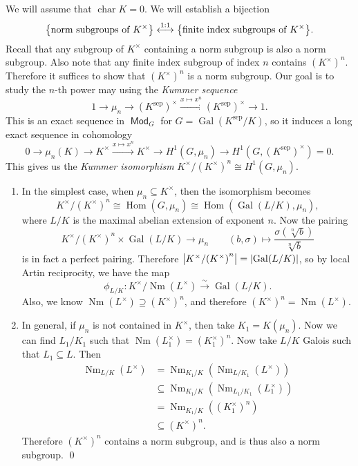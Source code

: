 \documentclass[leqno, openany]{memoir}
\theoremstyle{definition}
\theoremstyle{remark}
\theoremstyle{plain}
\theoremstyle{definition}
\theoremstyle{remark}
\newcommand{\mr}[1]{\mathrm{#1}}
\DeclareMathOperator{\Hom}{Hom}
\DeclareMathOperator{\Gal}{Gal}
\DeclareMathOperator{\Mod}{\mathsf{Mod}}
\DeclareMathOperator{\Nm}{Nm}
\begin{document}
We will assume that $\operatorname{char} K = 0$. We will establish a bijection
\[ \qty{\text{norm subgroups of $K^{\times}$}}
\overset{1:1}{\longleftrightarrow} \qty{\text{finite index subgroups of
$K^{\times}$}}. \] Recall that any subgroup of $K^{\times}$ containing a norm
subgroup is also a norm subgroup. Also note that any finite index subgroup of
index $n$ contains ${(K^{\times})}^n$. Therefore it suffices to show that
${(K^{\times})}^n$ is a norm subgroup. Our goal is to study the $n$-th power
may using the \textit{Kummer sequence} \[ 1 \to \mu_n \to
{(K^{\mr{sep}})}^{\times} \xrightarrow{x \mapsto x^n} {(K^{\mr{sep}})}^{\times}
\to 1. \] This is an exact sequence in $\Mod_G$ for $G = \Gal(K^{\mr{sep}}/K)$,
so it induces a long exact sequence in cohomology \[ 0 \to \mu_n(K) \to
K^{\times} \xrightarrow{x \mapsto x^n} K^{\times} \to H^1(G, \mu_n) \to H^1(G,
{(K^{\mr{sep}})}^{\times}) = 0. \] This gives us the \textit{Kummer
isomorphism} $K^{\times}/{(K^{\times})}^n \cong H^1(G, \mu_n)$.
\begin{enumerate} \item In the simplest case, when $\mu_n \subseteq
    K^{\times}$, then the isomorphism becomes \[ K^{\times}/{(K^{\times})}^n
    \cong \Hom(G, \mu_n) \cong \Hom(\Gal(L/K), \mu_n), \] where $L/K$ is the
    maximal abelian extension of exponent $n$. Now the pairing \[
    K^{\times}/{(K^{\times})}^n \times \Gal(L/K) \to \mu_n \qquad (b, \sigma)
\mapsto \frac{\sigma(\sqrt[n]{b})}{\sqrt[n]{b}} \] is in fact a perfect
pairing. Therefore $\abs{K^{\times}/{(K^{\times})}^n} = \abs{\Gal(L/K)}$, so by
local Artin reciprocity, we have the map \[ \phi_{L/K} \colon
K^{\times}/\Nm(L^{\times}) \xrightarrow{\sim} \Gal(L/K). \] Also, we know
$\Nm(L^{\times}) \supseteq {(K^{\times})}^n$, and therefore ${(K^{\times})}^n =
\Nm(L^{\times})$.  \item In general, if $\mu_n$ is not contained in
$K^{\times}$, then take $K_1 = K(\mu_n)$. Now we can find $L_1/K_1$ such that
$\Nm(L_1^{\times}) = {(K_1^{\times})}^n$. Now take $L/K$ Galois such that $L_1
\subseteq L$. Then \begin{align*} \Nm_{L/K}(L^{\times}) &= \Nm_{K_1/K} (
\Nm_{L/K_1}(L^{\times}) ) \\ &\subseteq
\Nm_{K_1/K}(\Nm_{L_1/K_1}(L_1^{\times})) \\ &= \Nm_{K_1/K}({(K_1^{\times})}^n)
                                         \\ &\subseteq {(K^{\times})}^n.
                                         \end{align*} Therefore
                                         ${(K^{\times})}^n$ contains a norm
                                         subgroup, and is thus also a norm
                                         subgroup. \qed \end{enumerate}
\end{document}
